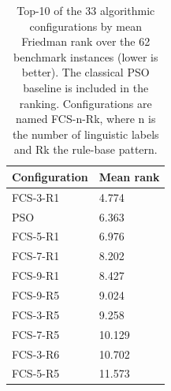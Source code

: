 \begin{table}[h]
\centering
\caption{Top-10 of the 33 algorithmic configurations by mean Friedman rank over the 62 benchmark instances (lower is better). The classical PSO baseline is included in the ranking. Configurations are named FCS-n-Rk, where n is the number of linguistic labels and Rk the rule-base pattern.}
\label{tab:top_configs}
\begin{tabular}{ll}
\toprule
Configuration & Mean rank \\
\midrule
FCS-3-R1 & 4.774 \\
PSO & 6.363 \\
FCS-5-R1 & 6.976 \\
FCS-7-R1 & 8.202 \\
FCS-9-R1 & 8.427 \\
FCS-9-R5 & 9.024 \\
FCS-3-R5 & 9.258 \\
FCS-7-R5 & 10.129 \\
FCS-3-R6 & 10.702 \\
FCS-5-R5 & 11.573 \\
\bottomrule
\end{tabular}
\end{table}
